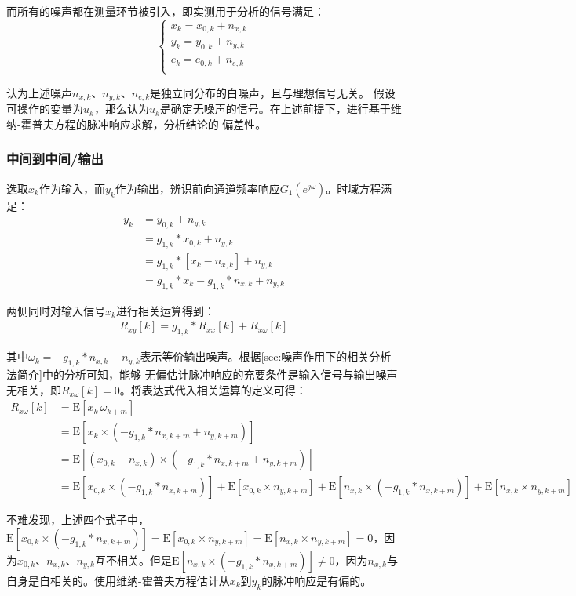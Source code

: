 而所有的噪声都在测量环节被引入，即实测用于分析的信号满足：
\begin{equation*}
    \begin{cases}
        x_k=x_{0,k}+n_{x,k}\\
        y_k=y_{0,k}+n_{y,k}\\
        e_k=e_{0,k}+n_{e,k}\\
    \end{cases}
\end{equation*}

认为上述噪声\(n_{x,k}\)、\(n_{y,k}\)、\(n_{e,k}\)是独立同分布的白噪声，且与理想信号无关。
假设可操作的变量为\(u_k\)，那么认为\(u_k\)是确定无噪声的信号。在上述前提下，进行基于维纳-霍普夫方程的脉冲响应求解，分析结论的
偏差性。

\subsubsection{中间到中间/输出}
选取\(x_k\)作为输入，而\(y_k\)作为输出，辨识前向通道频率响应\(G_1(e^{j\omega})\)。时域方程满足：
\begin{align*}
    y_k&=y_{0,k}+n_{y,k}\\
    &=g_{1,k}*x_{0,k}+n_{y,k}\\
    &=g_{1,k}*[x_k-n_{x,k}]+n_{y,k}\\
    &=g_{1,k}*x_k-g_{1,k}*n_{x,k}+n_{y,k}
\end{align*}

两侧同时对输入信号\(x_k\)进行相关运算得到：
\begin{align*}
    R_{xy}[k] = g_{1,k}*R_{xx}[k]+R_{x\omega}[k]
\end{align*}

其中\(\omega_k = -g_{1,k}*n_{x,k}+n_{y,k}\)表示等价输出噪声。根据\ref{sec:噪声作用下的相关分析法简介}中的分析可知，能够
无偏估计脉冲响应的充要条件是输入信号与输出噪声无相关，即\(R_{x\omega}[k]=0\)。将表达式代入相关运算的定义可得：
\begin{align*}
    R_{x\omega}[k] &= \text{E}[x_k\,\omega_{k+m}]\\
    &= \text{E}[x_k\times(-g_{1,k}*n_{x,k+m}+n_{y,k+m})]\\
    &= \text{E}[(x_{0,k}+n_{x,k})\times(-g_{1,k}*n_{x,k+m}+n_{y,k+m})]\\
    &= \text{E}[x_{0,k}\times(-g_{1,k}*n_{x,k+m})]+\text{E}[x_{0,k}\times n_{y,k+m}]
    + \text{E}[n_{x,k}\times(-g_{1,k}*n_{x,k+m})]+\text{E}[n_{x,k}\times n_{y,k+m}]
\end{align*}

不难发现，上述四个式子中，\(\text{E}[x_{0,k}\times(-g_{1,k}*n_{x,k+m})]=\text{E}[x_{0,k}\times n_{y,k+m}]=
\text{E}[n_{x,k}\times n_{y,k+m}]=0\)，因为\(x_{0,k}\)、\(n_{x,k}\)、\(n_{y,k}\)互不相关。但是\(\text{E}[n_{x,k}\times(-g_{1,k}*n_{x,k+m})]
\neq 0\)，因为\(n_{x,k}\)与自身是自相关的。使用维纳-霍普夫方程估计从\(x_k\)到\(y_k\)的脉冲响应是有偏的。

